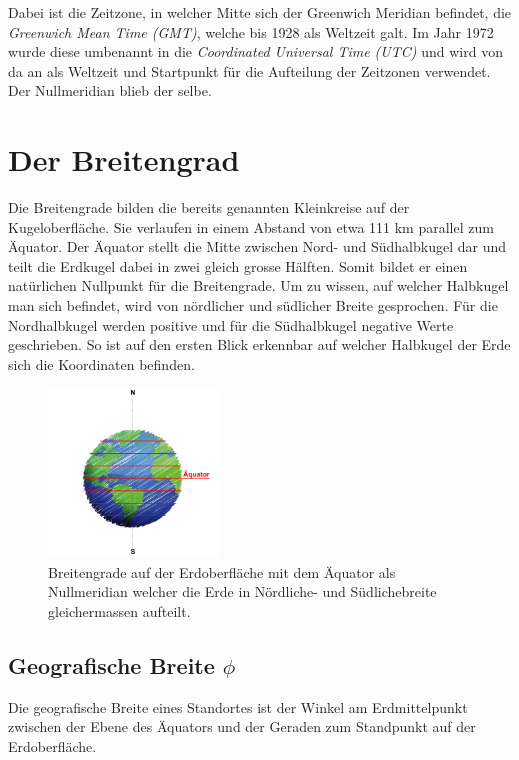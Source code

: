 \begin{refsection}
Dabei ist die Zeitzone, in welcher Mitte sich der Greenwich Meridian befindet, die \textit{Greenwich Mean Time (GMT)}, welche bis 1928 als Weltzeit galt. Im Jahr 1972 wurde diese umbenannt in die \textit{Coordinated Universal Time (UTC)} und wird von da an als Weltzeit und Startpunkt für die Aufteilung der Zeitzonen verwendet. Der Nullmeridian blieb der selbe.


\section{Der Breitengrad}
Die Breitengrade bilden die bereits genannten Kleinkreise auf der Kugeloberfläche. Sie verlaufen in einem Abstand von etwa 111 km parallel zum Äquator. Der Äquator stellt die Mitte zwischen Nord- und Südhalbkugel dar und teilt die Erdkugel dabei in zwei gleich grosse Hälften. Somit bildet er einen natürlichen Nullpunkt für die Breitengrade.
Um zu wissen, auf welcher Halbkugel man sich befindet, wird von nördlicher und südlicher Breite gesprochen. Für die Nordhalbkugel werden positive und für die Südhalbkugel negative Werte geschrieben. So ist auf den ersten Blick erkennbar auf welcher Halbkugel der Erde sich die Koordinaten befinden.

\begin{figure}[htbp]
\centering
\includegraphics[width=0.4\textwidth]{kugel/BreiteErdkugel.jpg}
\caption{Breitengrade auf der Erdoberfläche mit dem Äquator als Nullmeridian welcher die Erde in Nördliche- und Südlichebreite gleichermassen aufteilt.}
\end{figure}



\subsection{Geografische Breite $\phi$}
\begin{definition}
Die geografische Breite eines Standortes ist der Winkel am Erdmittelpunkt zwischen der Ebene des Äquators und der Geraden zum Standpunkt auf der Erdoberfläche.
\end{definition}


\end{refsection}

